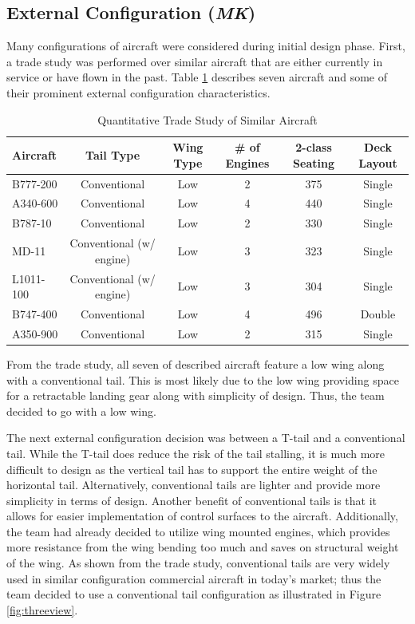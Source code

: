 \subsection{External Configuration  (\textit{MK})}
Many configurations of aircraft were considered during initial design phase. First, a trade study was performed over similar aircraft that are either currently in service or have flown in the past. Table \ref{tabmk1} describes seven aircraft and some of their prominent external configuration characteristics. 

\begin{table}[!h]
    \centering
    \caption{Quantitative Trade Study of Similar Aircraft}
    \begin{tabular}{|m{2cm}||c|c|c|c|c|}
    \toprule
    \label{tabmk1}
    \textbf{Aircraft} & \textbf{Tail Type} & \textbf{Wing Type} & \textbf{\# of Engines} & \textbf{2-class Seating} & \textbf{Deck Layout} \\
    \hline\hline
    B777-200 & Conventional & Low & 2 & 375 & Single \\ 
    \hline
    A340-600 & Conventional & Low & 4 & 440 & Single \\
    \hline
    B787-10 & Conventional & Low & 2 & 330 & Single \\
    \hline
    MD-11 & Conventional (w/ engine) & Low & 3 & 323 & Single \\
    \hline
    L1011-100 & Conventional (w/ engine) & Low & 3 & 304 & Single \\
    \hline
    B747-400 & Conventional & Low & 4 & 496 & Double \\
    \hline
    A350-900 & Conventional & Low & 2 & 315 & Single \\
    \bottomrule
    \end{tabular}
\end{table}
\clearpage
From the trade study, all seven of described aircraft feature a low wing along with a conventional tail. This is most likely due to the low wing providing space for a retractable landing gear along with simplicity of design. Thus, the team decided to go with a low wing.

The next external configuration decision was between a T-tail and a conventional tail. While the T-tail does reduce the risk of the tail stalling, it is much more difficult to design as the vertical tail has to support the entire weight of the horizontal tail. Alternatively, conventional tails are lighter and provide more simplicity in terms of design. Another benefit of conventional tails is that it allows for easier implementation of control surfaces to the aircraft. Additionally, the team had already decided to utilize wing mounted engines, which provides more resistance from the wing bending too much and saves on structural weight of the wing. As shown from the trade study, conventional tails are very widely used in similar configuration commercial aircraft in today's market; thus the team decided to use a conventional tail configuration as illustrated in Figure \ref{fig:threeview}.

